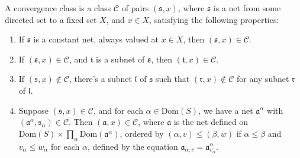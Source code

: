 \begin{definition}
    A convergence class is a class $\mathcal{C}$ of pairs $(\mathfrak{s},x)$, where $\mathfrak{s}$ is a net from some directed set to a fixed set $X$, and $x \in X$, satisfying the following properties:
    \begin{enumerate}
        \item If $\mathfrak{s}$ is a constant net, always valued at $x \in X$, then $(\mathfrak{s},x) \in \mathcal{C}$.
        \item If $(\mathfrak{s},x) \in \mathcal{C}$, and $\mathfrak{t}$ is a subnet of $\mathfrak{s}$, then $(\mathfrak{t},x) \in \mathcal{C}$.
        \item If $(\mathfrak{s},x) \not \in \mathcal{C}$, there's a subnet $\mathfrak{l}$ of $\mathfrak{s}$ such that $(\mathfrak{r},x) \not \in \mathcal{C}$ for any subnet $\mathfrak{r}$ of $\mathfrak{l}$.
        \item Suppose $(\mathfrak{s},x) \in \mathcal{C}$, and for each $\alpha \in \text{Dom}(S)$, we have a net $\mathfrak{a}^\alpha$ with $(\mathfrak{a}^\alpha, \mathfrak{s}_\alpha) \in \mathcal{C}$. Then $(\mathfrak{a},x) \in \mathcal{C}$, where $\mathfrak{a}$ is the net defined on $\text{Dom}(S) \times \prod_{\alpha} \text{Dom}(\mathfrak{a}^\alpha)$, ordered by $(\alpha, v) \leq (\beta, w)$ if $\alpha \leq \beta$ and $v_\alpha \leq w_\alpha$ for each $\alpha$, defined by the equation $\mathfrak{a}_{\alpha, v} = \mathfrak{a}^\alpha_{v_\alpha}$.
    \end{enumerate}
\end{definition}

